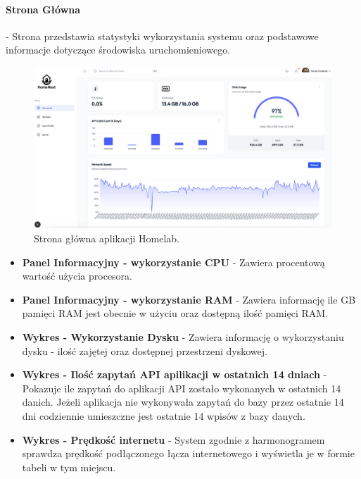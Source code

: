 \paragraph{Strona Główna} - Strona przedstawia statystyki wykorzystania systemu oraz podstawowe informacje dotyczące środowiska uruchomieniowego.
\begin{figure}[H]
  \centering
  \includegraphics[width=1\textwidth]{./chapters/assets/UI_HomePage.png}
  \caption{Strona główna aplikacji Homelab.}
  \label{fig:ui_homepage}
\end{figure}
\begin{itemize}
    \item \textbf{Panel Informacyjny - wykorzystanie CPU} - Zawiera procentową wartość użycia procesora.
    \item \textbf{Panel Informacyjny - wykorzystanie RAM} - Zawiera informację ile GB pamięci RAM jest obecnie w użyciu oraz dostępną ilość pamięci RAM.
    \item \textbf{Wykres - Wykorzystanie Dysku} - Zawiera informację o wykorzystaniu dysku - ilość zajętej oraz dostępnej przestrzeni dyskowej.
    \item \textbf{Wykres - Ilość zapytań API apilikacji w ostatnich 14 dniach} - Pokazuje ile zapytań do aplikacji API zostało wykonanych w ostatnich 14 danich. Jeżeli aplikacja nie wykonywała zapytań do bazy przez ostatnie 14 dni codziennie umieszczne jest ostatnie 14 wpisów z bazy danych.
    \item \textbf{Wykres - Prędkość internetu} - System zgodnie z harmonogramem sprawdza prędkość podłączonego łącza internetowego i wyświetla je w formie tabeli w tym miejscu.
\end{itemize}


